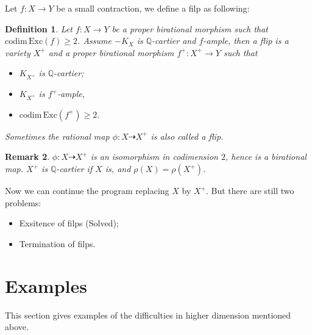 \documentclass{article}
\newtheorem{defn}{Definition}[section]
\newtheorem{rmk}[defn]{Remark}
\begin{document}
Let $ f:X\to Y $ be a small contraction, we define a filp as following:
\begin{defn}
	Let $ f:X\to Y $ be a proper birational morphism such that $ \mathrm{codim}\,\mathrm{Exc}(f)\geqslant 2 $. Assume  $ -K_X $ is $ \mathbb{Q} $-cartier and $ f $-ample, then a \emph{flip} is a variety $ X^+ $ and a proper birational morphism $ f^+:X^+\to Y $ such that
	\begin{itemize}
		\item $ K_{X^+} $ is $ \mathbb{Q} $-cartier;
		\item $ K_{X^+} $ is $ f^+ $-ample,
		\item $ \mathrm{codim}\,\mathrm{Exc}(f^+)\geqslant 2 $.
	\end{itemize}
	Sometimes the rational map $ \phi:X\dashrightarrow X^+ $ is also called a flip.
\end{defn}
\begin{rmk}
	$ \phi:X\dashrightarrow X^+ $ is an isomorphism in codimension $ 2 $, hence is a birational map. $ X^+ $ is $ \mathbb{Q} $-cartier if $ X $ is, and $ \rho(X)=\rho(X^+) $.
\end{rmk}
Now we can continue the program  replacing $ X $ by $ X^+ $. But there are still two problems:
\begin{itemize}
	\item Exsitence of filps (Solved);
	\item Termination of filps.
\end{itemize}
\section{Examples}
This section gives examples of the difficulties in higher dimension mentioned above.
\end{document}
